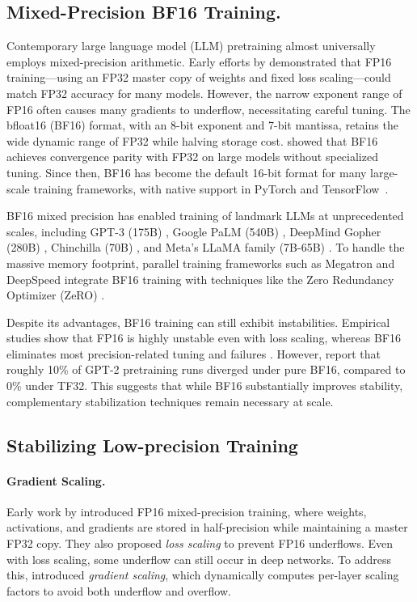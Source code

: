 \documentclass{article} %
\begin{document}
\subsection{Mixed-Precision BF16 Training.}  
Contemporary large language model (LLM) pretraining almost universally employs mixed-precision arithmetic. Early efforts by \citet{micikevicius2017mixed} demonstrated that FP16 training---using an FP32 master copy of weights and fixed loss scaling---could match FP32 accuracy for many models. However, the narrow exponent range of FP16 often causes many gradients to underflow, necessitating careful tuning. The bfloat16 (BF16) format, with an 8-bit exponent and 7-bit mantissa, retains the wide dynamic range of FP32 while halving storage cost. \citet{kalamkar2019study} showed that BF16 achieves convergence parity with FP32 on large models without specialized tuning. Since then, BF16 has become the default 16-bit format for many large-scale training frameworks, with native support in PyTorch and TensorFlow~\citep{wang2019bfloat16}. 

BF16 mixed precision has enabled training of landmark LLMs at unprecedented scales, including GPT-3 (175B) \citep{brown2020language}, Google PaLM (540B) \citep{chowdhery2023palm}, DeepMind Gopher (280B) \citep{rae2021scaling}, Chinchilla (70B) \citep{hoffmann2022training}, and Meta's LLaMA family (7B-65B) \citep{touvron2023llama}. To handle the massive memory footprint, parallel training frameworks such as Megatron and DeepSpeed integrate BF16 training with techniques like the Zero Redundancy Optimizer (ZeRO) \citep{rajbhandari2020zero}.

Despite its advantages, BF16 training can still exhibit instabilities. Empirical studies show that FP16 is highly unstable even with loss scaling, whereas BF16 eliminates most precision-related tuning and failures \cite{wang2019bfloat16}. However, \citet{lee2024fp8} report that roughly 10\% of GPT-2 pretraining runs diverged under pure BF16, compared to 0\% under TF32. This suggests that while BF16 substantially improves stability, complementary stabilization techniques remain necessary at scale. 

\subsection{Stabilizing Low-precision Training}

\paragraph{Gradient Scaling.}
Early work by \citet{micikevicius2017mixed} introduced FP16 mixed-precision training, where weights, activations, and gradients are stored in half-precision while maintaining a master FP32 copy. They also proposed \textit{loss scaling} to prevent FP16 underflows. Even with loss scaling, some underflow can still occur in deep networks. To address this, \citet{zhao2021reducing} introduced \textit{gradient scaling}, which dynamically computes per-layer scaling factors to avoid both underflow and overflow.
\end{document}
